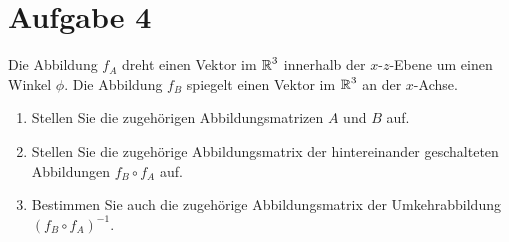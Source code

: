 \documentclass[main.tex]{subfiles}
\begin{document}
\section{Aufgabe 4}
Die Abbildung $f_A$ dreht einen Vektor im $\operatorname{\mathbb{R}}^3$ innerhalb der $x$-$z$-Ebene um einen Winkel $\phi$. Die Abbildung $f_B$ spiegelt einen Vektor im $\operatorname{\mathbb{R}}^3$ an der $x$-Achse.
\begin{enumerate}
	\item Stellen Sie die zugehörigen Abbildungsmatrizen $A$ und $B$ auf.
	\item Stellen Sie die zugehörige Abbildungsmatrix der hintereinander geschalteten Abbildungen $f_B\circ f_A$ auf.
	\item Bestimmen Sie auch die zugehörige Abbildungsmatrix der Umkehrabbildung $(f_B\circ f_A)^{-1}$.
\end{enumerate}
\end{document}
